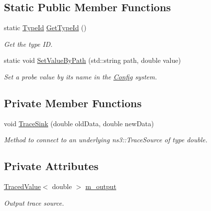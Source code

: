 \subsection*{Static Public Member Functions}
\begin{DoxyCompactItemize}
\item 
static \hyperlink{classns3_1_1TypeId}{Type\+Id} \hyperlink{classns3_1_1DoubleProbe_ace0a3e9fd30c5412cecf3d2b4c935429}{Get\+Type\+Id} ()
\begin{DoxyCompactList}\small\item\em Get the type ID. \end{DoxyCompactList}\item 
static void \hyperlink{classns3_1_1DoubleProbe_a4e790097e875ae86a5640a1b186e1b1c}{Set\+Value\+By\+Path} (std\+::string path, double value)
\begin{DoxyCompactList}\small\item\em Set a probe value by its name in the \hyperlink{namespacens3_1_1Config}{Config} system. \end{DoxyCompactList}\end{DoxyCompactItemize}
\subsection*{Private Member Functions}
\begin{DoxyCompactItemize}
\item 
void \hyperlink{classns3_1_1DoubleProbe_a691ff6f20c11588e5e3af4321cb0f6b5}{Trace\+Sink} (double old\+Data, double new\+Data)
\begin{DoxyCompactList}\small\item\em Method to connect to an underlying ns3\+::\+Trace\+Source of type double. \end{DoxyCompactList}\end{DoxyCompactItemize}
\subsection*{Private Attributes}
\begin{DoxyCompactItemize}
\item 
\hyperlink{classns3_1_1TracedValue}{Traced\+Value}$<$ double $>$ \hyperlink{classns3_1_1DoubleProbe_ae07e0f2547fae60abcaab3c13eb138d3}{m\+\_\+output}
\begin{DoxyCompactList}\small\item\em Output trace source. \end{DoxyCompactList}\end{DoxyCompactItemize}
